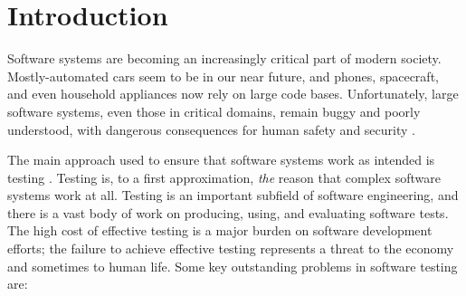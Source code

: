 
\section{Introduction}


Software systems are becoming an increasingly critical part of modern
society.  Mostly-automated cars seem to be in our near future, and
phones, spacecraft, and even household appliances now rely on large
code bases.  Unfortunately, large software systems, even those in
critical domains, remain buggy and poorly understood, with dangerous
consequences for human safety and security \cite{nist-report}.

The main approach used to ensure that software systems work as
intended is testing \cite{nist-testing}.  Testing is, to a first
approximation, \textit{the} reason that complex software systems work
at all.  Testing is an important subfield of software engineering, and
there is a vast body of work on producing, using, and evaluating
software tests.  The high cost of effective testing is a major burden
on software development efforts; the failure to achieve effective
testing represents a threat to the economy and sometimes to human
life.
%
Some key outstanding problems in software testing are:

